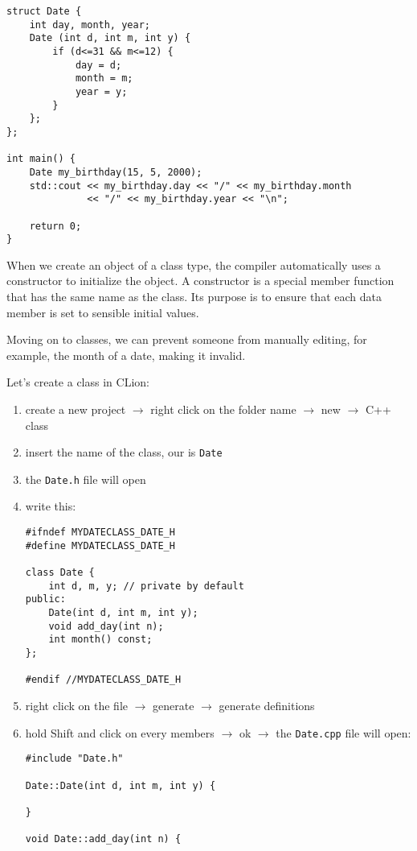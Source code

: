 \begin{enumerate}[$\triangleright$]
\begin{lstlisting}
struct Date {
    int day, month, year;
    Date (int d, int m, int y) {
        if (d<=31 && m<=12) {
            day = d;
            month = m;
            year = y;
        }
    };
};

int main() {
    Date my_birthday(15, 5, 2000);
    std::cout << my_birthday.day << "/" << my_birthday.month
              << "/" << my_birthday.year << "\n";

    return 0;
}
\end{lstlisting}

    \begin{marker}
    When we create an object of a class type, the compiler automatically uses a constructor to initialize the object. A constructor is a special member function that has the same name as the class. Its purpose is to ensure that each data member is set to sensible initial values.  
    \end{marker}

    Moving on to classes, we can prevent someone from manually editing, for example, the month of a date, making it invalid.

    Let's create a class in CLion:
    \begin{enumerate}
        \item create a new project $\to$ right click on the folder name $\to$ new $\to$ C++ class
        \item insert the name of the class, our is \texttt{Date}
        \item the \texttt{Date.h} file will open
        \item write this:
        \begin{lstlisting}
#ifndef MYDATECLASS_DATE_H
#define MYDATECLASS_DATE_H

class Date {
    int d, m, y; // private by default
public:
    Date(int d, int m, int y);
    void add_day(int n);
    int month() const;
};

#endif //MYDATECLASS_DATE_H     
\end{lstlisting}
        \item right click on the file $\to$ generate $\to$ generate definitions
        \item hold Shift and click on every members $\to$ ok $\to$ the \texttt{Date.cpp} file will open:
        \begin{lstlisting}
#include "Date.h"

Date::Date(int d, int m, int y) {

}

void Date::add_day(int n) {


\end{lstlisting}
\end{enumerate}
\end{enumerate}
